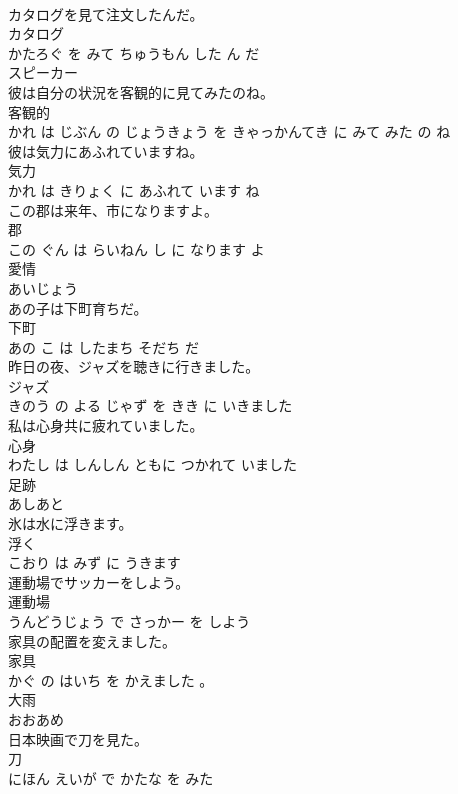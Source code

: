 \documentclass[8pt]{extreport}
\begin{document}
\begin{CJK}{UTF8}{min}
\\	カタログを見て注文したんだ。	
\\	カタログ 
\\	かたろぐ を みて ちゅうもん した ん だ			
\\	スピーカー	
\\	彼は自分の状況を客観的に見てみたのね。	
\\	客観的 
\\	かれ は じぶん の じょうきょう を きゃっかんてき に みて みた の ね			
\\	彼は気力にあふれていますね。	
\\	気力 
\\	かれ は きりょく に あふれて います ね			
\\	この郡は来年、市になりますよ。	
\\	郡 
\\	この ぐん は らいねん し に なります よ			
\\	愛情	
\\	あいじょう			
\\	あの子は下町育ちだ。	
\\	下町 
\\	あの こ は したまち そだち だ			
\\	昨日の夜、ジャズを聴きに行きました。	
\\	ジャズ 
\\	きのう の よる じゃず を きき に いきました			
\\	私は心身共に疲れていました。	
\\	心身 
\\	わたし は しんしん ともに つかれて いました			
\\	足跡	
\\	あしあと			
\\	氷は水に浮きます。	
\\	浮く 
\\	こおり は みず に うきます			
\\	運動場でサッカーをしよう。	
\\	運動場 
\\	うんどうじょう で さっかー を しよう			
\\	家具の配置を変えました。	
\\	家具 
\\	かぐ の はいち を かえました 。			
\\	大雨	
\\	おおあめ			
\\	日本映画で刀を見た。	
\\	刀 
\\	にほん えいが で かたな を みた			

\end{CJK}
\end{document}
